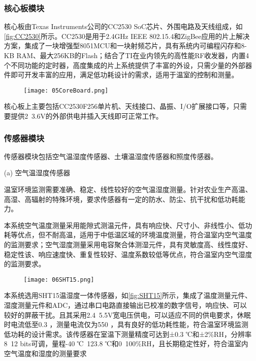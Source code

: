 		\subsubsection{核心板模块}
		核心板由Texas Instruments公司的CC2530 SoC芯片、外围电路及天线组成，如\ref{fig:CC2530}所示。CC2530是用于2.4GHz IEEE 802.15.4和ZigBee应用的片上解决方案，集成了一块增强型8051MCU和一块射频芯片，具有系统内可编程闪存和8-KB RAM、最大256KB的Flash；结合了TI在业内领先的高性能RF收发器，内置4个不同功能的定时器，高度集成的片上系统提供了丰富的外设，只需少量的外部器件即可开发丰富的应用，满足低功耗设计的需求，适用于温室的控制和测量。
		\begin{figure}[!htp]
  			\centering
 			\texttt{[image: 05CoreBoard.png]}
		\end{figure}
		
		核心板上主要包括CC2530F256单片机、天线接口、晶振、I/O扩展接口等，只需要提供2~3.6V的外部供电并插入天线即可正常工作。
		\subsubsection{传感器模块}
		传感器模块包括空气温湿度传感器、土壤温湿度传感器和照度传感器。
		
		(a) 空气温湿度传感器
		
		温室环境监测需要准确、稳定、线性较好的空气温湿度测量。针对农业生产高温、高湿、高辐射的特殊环境，要求传感器有一定的防水、防尘、抗干扰和低功耗能力。
		
		本系统空气温度测量采用能隙式测温元件，具有响应快、尺寸小、非线性小、低功耗等优点，但不耐高温，适用于中低温区域的环境温度测量，符合温室内空气温度的监测要求；空气湿度测量采用电容聚合体测湿元件，具有灵敏度高、线性度好、稳定性该、响应速度快、重复性较好、温度系数较低等优点，符合温室内空气湿度的监测要求。
 		\begin{figure}[!htp]
  			\centering
 			\texttt{[image: 06SHT15.png]}
		\end{figure}
		本系统选用SHT15温湿度一体传感器，如\ref{fig:SHT15}所示，集成了温度测量元件、湿度测量元件和ADC，通过串口电路直接输出已校准的数字信号，响应快、可以较好的屏蔽干扰。且其采用2.4~5.5V宽电压供电，可以适应不同的供电要求，休眠时电流低至0.3 ，测量电流仅为550 ，具有良好的低功耗性能，符合温室环境监测低功耗的设计需求。该传感器在室温下测量精度可达到±0.3 ℃和±2\%RH，分辨率8~12 bits可调，量程-40 ℃~123.8 ℃和0~100\%RH，且长期稳定性好，符合温室内空气温度和湿度的测量要求
		
